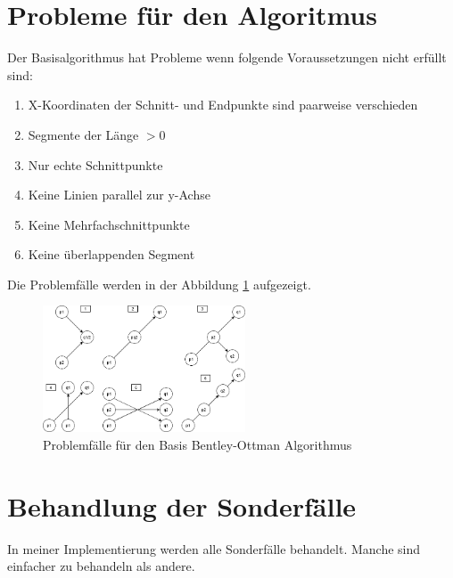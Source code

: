 \documentclass[conference]{IEEEtran}
\begin{document}
	\section{Probleme für den Algoritmus}
	Der Basisalgorithmus hat Probleme wenn folgende Voraussetzungen nicht erfüllt sind:
	\begin{enumerate}
		\item X-Koordinaten der Schnitt- und Endpunkte sind paarweise verschieden
		
		\item Segmente der Länge $> 0$
		
		\item Nur echte Schnittpunkte
		
		\item Keine Linien parallel zur y-Achse
		
		\item Keine Mehrfachschnittpunkte
		
		\item Keine überlappenden Segment
	\end{enumerate}
	Die Problemfälle werden in der Abbildung \ref{Problem} aufgezeigt.
	\begin{figure}[h]
		\begin{center}
			\includegraphics[width=6cm]{ProblemFaelle.png}
			\caption{Problemfälle für den Basis Bentley-Ottman Algorithmus}
			\label{Problem}
		\end{center}
	\end{figure}

	\section{Behandlung der Sonderfälle}
	In meiner Implementierung werden alle Sonderfälle behandelt. Manche sind einfacher zu behandeln als andere.
\end{document}
